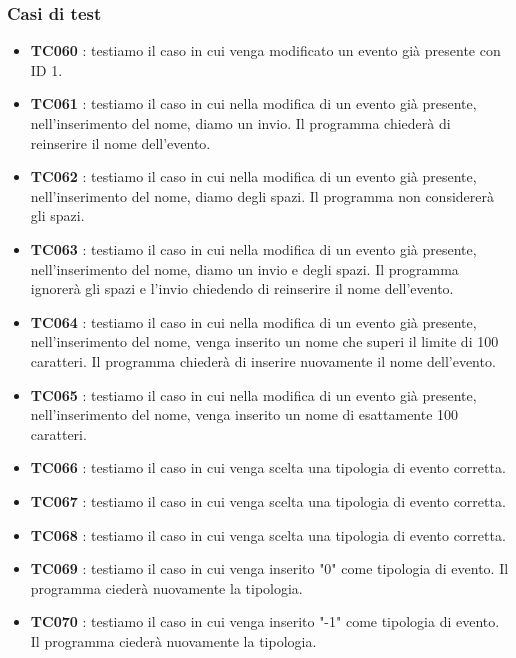 \documentclass[11pt]{scrartcl} %
\begin{document}
\subsubsection{Casi di test}
\begin{itemize}

	\item \textbf{TC060} : testiamo il caso in cui venga modificato un evento già presente con ID 1.

	\item \textbf{TC061} : testiamo il caso in cui nella modifica di un evento già presente, nell'inserimento del nome, diamo un invio. Il programma chiederà di reinserire il nome dell'evento.

	\item \textbf{TC062} : testiamo il caso in cui nella modifica di un evento già presente, nell'inserimento del nome, diamo degli spazi. Il programma non considererà gli spazi.

	\item \textbf{TC063} : testiamo il caso in cui nella modifica di un evento già presente, nell'inserimento del nome, diamo un invio e degli spazi. Il programma ignorerà gli spazi e l'invio chiedendo di reinserire il nome dell'evento.

	\item \textbf{TC064} : testiamo il caso in cui nella modifica di un evento già presente, nell'inserimento del nome, venga inserito un nome che superi il limite di 100 caratteri. Il programma chiederà di inserire nuovamente il nome dell'evento.

	\item \textbf{TC065} : testiamo il caso in cui nella modifica di un evento già presente, nell'inserimento del nome, venga inserito un nome di esattamente 100 caratteri.
 	\item \textbf{TC066} : testiamo il caso in cui venga scelta una tipologia di evento corretta.

	\item \textbf{TC067} : testiamo il caso in cui venga scelta una tipologia di evento corretta.

	\item \textbf{TC068} : testiamo il caso in cui venga scelta una tipologia di evento corretta.

	\item \textbf{TC069} : testiamo il caso in cui venga inserito "0"  come tipologia di evento. Il programma ciederà nuovamente la tipologia.

	\item \textbf{TC070} : testiamo il caso in cui venga inserito "-1" come tipologia di evento. Il programma ciederà nuovamente la tipologia.


\end{itemize}
\end{document}
